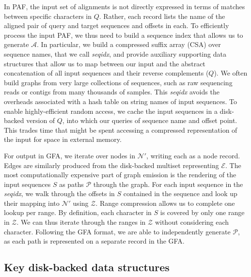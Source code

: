 \documentclass{bioinfo}
\theoremstyle{definition}
\begin{document}
In PAF, the input set of alignments is not directly expressed in terms of matches between specific characters in $Q$.
Rather, each record lists the name of the aligned pair of query and target sequences and offsets in each.
To efficiently process the input PAF, we thus need to build a sequence index that allows us to generate $\mathcal{A}$.
In particular, we build a compressed suffix array (CSA) \citep{Sadakane_2000} over sequence names, that we call \textit{seqidx}, and provide auxiliary supporting data structures that allow us to map between our input and the abstract concatenation of all input sequences and their reverse complements ($Q$).
We often build graphs from very large collections of sequences, such as raw sequencing reads or contigs from many thousands of samples.
This \textit{seqidx} avoids the overheads associated with a hash table on string names of input sequences.
To enable highly-efficient random access, we cache the input sequences in a disk-backed version of $Q$, into which our queries of sequence name and offset point.
This trades time that might be spent accessing a compressed representation of the input for space in external memory.

For output in GFA, we iterate over nodes in $\mathcal{N}'$, writing each as a node record.
Edges are similarly produced from the disk-backed multiset representing $\mathcal{E}$.
The most computationally expensive part of graph emission is the rendering of the input sequences $S$ as paths $\mathcal{P}$ through the graph.
For each input sequence in the \textit{seqidx}, we walk through the offsets in $S$ contained in the sequence and look up their mapping into $\mathcal{N}'$ using $\mathcal{Z}$.
Range compression allows us to complete one lookup per range.
By definition, each character in $S$ is covered by only one range in $\mathcal{Z}$.
We can thus iterate through the ranges in $\mathcal{Z}$ without considering each character.
Following the GFA format, we are able to independently generate $\mathcal{P}$, as each path is represented on a separate record in the GFA.

\subsection{Key disk-backed data structures}
\end{document}
